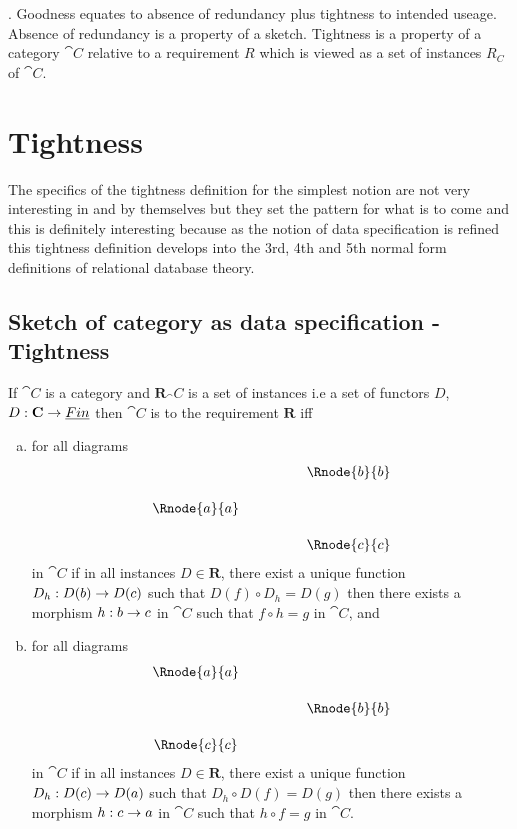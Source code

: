 \documentclass[10pt,a4paper]{article}
\newcounter{para}
\newcommand\note{\par\refstepcounter{para}\thepara.\space}
\newcommand{\reqt}{\textbf{R}}
\newcommand{\finset}{\underline{Fin}}
\begin{document}
\note
Goodness equates to absence of redundancy plus tightness to intended useage. Absence of redundancy is a property of a sketch. Tightness
is a property of a category $\cat{C}$ relative to a requirement $R$ which is viewed as a set of instances $R_C$ of $\cat{C}$.

\section*{Tightness}
The specifics of the tightness definition for the simplest notion  are not very interesting in and by themselves but they set the pattern for what is to come and this is definitely interesting because as the notion of data specification is refined this tightness definition develops into the 3rd, 4th and 5th normal form definitions of relational database theory.
\subsection*{Sketch of category as data specification - Tightness}
If $\cat{C}$ is a category and $\reqt_\cat{C}$ is a set of instances i.e a set of functors $D$, $D: \cat{C} \morph \finset$ then $\cat{C}$ is 
 to the requirement $\reqt$ iff
\begin{enumerate}[(a)]
\item for all diagrams
\begin{displaymath}
\begin{array}{c p{1cm} c  }
             &&   \Rnode{b}{b} \\[0.5cm]
\Rnode{a}{a} &&                \\[0.5cm] 
             &&   \Rnode{c}{c}         
\end{array} 
\end{displaymath}
in $\cat{C}$ if in all instances $D \in \reqt$, there exist a unique function $D_h : D(b) \rightarrow D(c)$ such that
$D(f) \circ D_h = D(g)$ then there exists a morphism $h:b \rightarrow c$ in $\cat{C}$ such that $f \circ h = g$ in $\cat{C}$, and
\item for all diagrams
\begin{displaymath}
\begin{array}{c p{1cm} c  }
\Rnode{a}{a} &&                \\[0.5cm] 
             &&   \Rnode{b}{b} \\[0.5cm]
\Rnode{c}{c}         
\end{array} 
\end{displaymath}
in $\cat{C}$ if in all instances $D \in \reqt$, there exist a unique function $D_h : D(c) \rightarrow D(a)$ such that
$D_h \circ D(f) = D(g)$ then there exists a morphism $h:c \rightarrow a$ in $\cat{C}$ such that $h \circ f = g$ in $\cat{C}$.
\end{enumerate}
\end{document}
